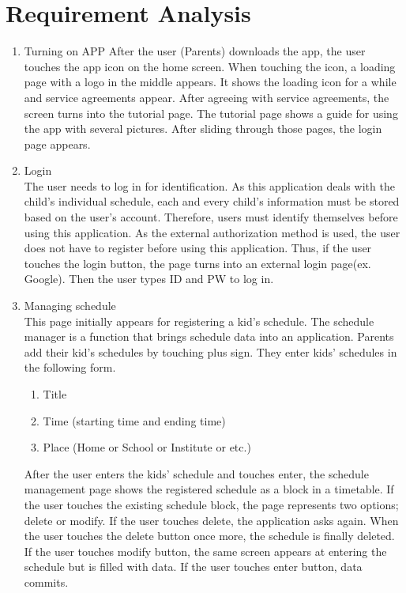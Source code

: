 \documentclass[conference]{IEEEtran}
\begin{document}
\section{\Large{Requirement Analysis}}
\begin{enumerate}[label=\arabic*.] 
    \item {\large{Turning on APP}} \newline
    After the user (Parents) downloads the app, the user touches the app icon on the home screen. When touching the icon, a loading page with a logo in the middle appears. It shows the loading icon for a while and service agreements appear. After agreeing with service agreements, the screen turns into the tutorial page. The tutorial page shows a guide for using the app with several pictures. After sliding through those pages, the login page appears. \\
    \item {\large{Login}} \\    
    The user needs to log in for identification. As this application deals with the child’s individual schedule, each and every child’s information must be stored based on the user’s account. Therefore, users must identify themselves before using this application. As the external authorization method is used, the user does not have to register before using this application. Thus, if the user touches the login button, the page turns into an external login page(ex. Google). Then the user types ID and PW to log in. \\
    \item {\large{Managing schedule}} \\        
    This page initially appears for registering a kid’s schedule. The schedule manager is a function that brings schedule data into an application. Parents add their kid’s schedules by touching plus sign. They enter kids’ schedules in the following form. \\
    \begin{enumerate}[label=\alph*.]
        \item Title
        \item Time (starting time and ending time)
        \item Place (Home or School or Institute or etc.)\\
    \end{enumerate}
    After the user enters the kids’ schedule and touches enter, the schedule management page shows the registered schedule as a block in a timetable. If the user touches the existing schedule block, the page represents two options; delete or modify. If the user touches delete, the application asks again. When the user touches the delete button once more, the schedule is finally deleted. If the user touches modify button, the same screen appears at entering the schedule but is filled with data. If the user touches enter button, data commits.\\

\end{enumerate}
\end{document}
